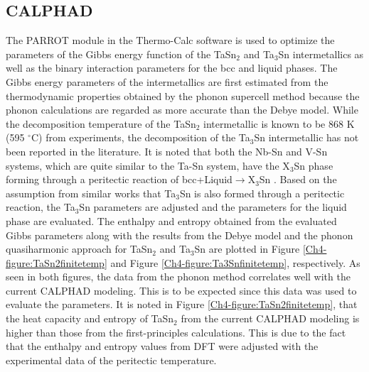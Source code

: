 \subsection{CALPHAD}

The PARROT module in the Thermo-Calc software \cite{Andersson2002} is used to optimize the parameters of the Gibbs energy function of the TaSn$_2$ and Ta$_3$Sn intermetallics as well as the binary interaction parameters for the bcc and liquid phases. The Gibbs energy parameters of the intermetallics are first estimated from the thermodynamic properties obtained by the phonon supercell method because the phonon calculations are regarded as more accurate than the Debye model. While the decomposition temperature of the TaSn$_2$ intermetallic is known to be 868 K (595 $^\circ$C) from experiments, the decomposition of the Ta$_3$Sn intermetallic has not been reported in the literature. It is noted that both the Nb-Sn and V-Sn systems, which are quite similar to the Ta-Sn system, have the X$_3$Sn phase forming through a peritectic reaction of bcc+Liquid$\rightarrow$X$_3$Sn \cite{Yue2009,Toffolon2002,Toffolon1998}. Based on the assumption from similar works that Ta$_3$Sn is also formed through a peritectic reaction, the Ta$_3$Sn parameters are adjusted and the parameters for the liquid phase are evaluated. The enthalpy and entropy obtained from the evaluated Gibbs parameters along with the results from the Debye model and the phonon quasiharmonic approach for TaSn$_2$ and Ta$_3$Sn are plotted in Figure \ref{Ch4-figure:TaSn2finitetemp} and Figure \ref{Ch4-figure:Ta3Snfinitetemp}, respectively. As seen in both figures, the data from the phonon method correlates well with the current CALPHAD modeling. This is to be expected since this data was used to evaluate the parameters. It is noted in Figure \ref{Ch4-figure:TaSn2finitetemp}, that the heat capacity and entropy of TaSn$_2$ from the current CALPHAD modeling is higher than those from the first-principles calculations. This is due to the fact that the enthalpy and entropy values from DFT were adjusted with the experimental data of the peritectic temperature.

